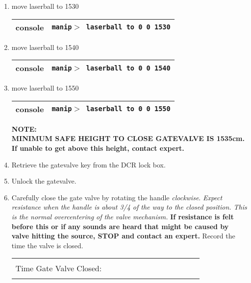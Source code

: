 \begin{enumerate}
  
\begin{center}
           {\bf Retracting source above gate valve.  Side ropes NOT attached.}
\end{center}
\item\checkbox move laserball to 1530
  \begin{center}
  \begin{tabular}{|l|l|}
  \hline
  console & {\tt manip$>$ laserball to 0 0 1530} \\
  \hline
  \end{tabular}
  \end{center}  
\item\checkbox move laserball to 1540
  \begin{center}
  \begin{tabular}{|l|l|}
  \hline
  console & {\tt manip$>$ laserball to 0 0 1540} \\
  \hline
  \end{tabular}
  \end{center}  
\item\checkbox move laserball to 1550
  \begin{center}
  \begin{tabular}{|l|l|}
  \hline
  console & {\tt manip$>$ laserball to 0 0 1550} \\
  \hline
  \end{tabular}
  \end{center}
{\bf
 NOTE:\\
   MINIMUM SAFE HEIGHT TO CLOSE GATEVALVE IS 1535cm.\\
   If unable to get above this height, contact expert.
}
\item\checkbox Retrieve the gatevalve key from the DCR lock box.
\item\checkbox Unlock the gatevalve.
\item\checkbox Carefully close the gate valve by rotating the handle {\em clockwise}.
  {\em Expect resistance when the handle is about 3/4 of the way to
  the closed position.  This is the normal overcentering of the
  valve mechanism.} {\bf If resistance is felt before this or 
  if any sounds are heard that might be caused by valve hitting the source,
  STOP and contact an expert.}
  Record the time the valve is closed.
     \begin{center}
     \begin{tabular}{|l|}
     \hline
      \\
     Time Gate Valve Closed:~~~~~~~~~~~~~~~~~~~~~~~~\\
      \\
     \hline
     \end{tabular}
     \end{center}
 

\end{enumerate}
